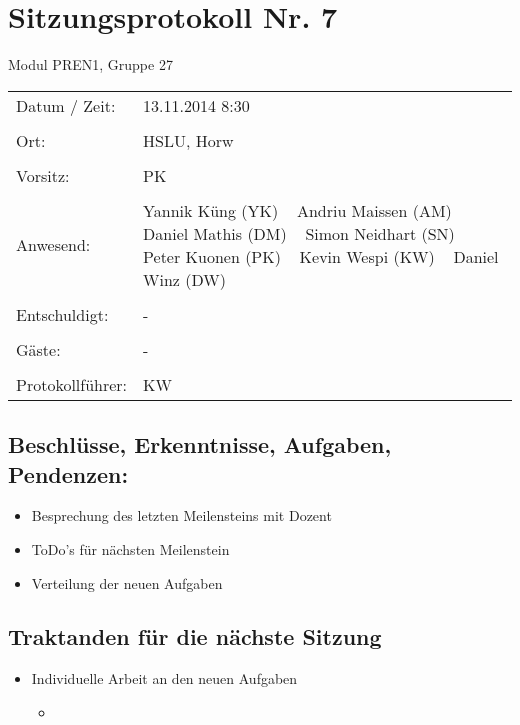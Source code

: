 \documentclass[a4paper,10pt,fleqn]{article}
\begin{document}
\section*{Sitzungsprotokoll Nr. 7}
Modul PREN1, Gruppe 27

\begin{longtable}[l]{@{}p{}@{}p{}@{}}
    Datum / Zeit: &
        13.11.2014 8:30
        \\\\
    Ort: &
        HSLU, Horw
        \\\\
    Vorsitz: &
        PK
        \\\\
    Anwesend: &
        Yannik Küng (YK) ~
        Andriu Maissen (AM) ~
        Daniel Mathis (DM) ~
        Simon Neidhart (SN) ~
        Peter Kuonen (PK) ~
        Kevin Wespi (KW) ~
        Daniel Winz (DW) ~
        \\\\
    Entschuldigt: &
        - ~
        \\\\
    Gäste: &
        - ~
        \\\\
    Protokollführer: &
        KW
        \\
\end{longtable}
%
\subsection*{Beschlüsse, Erkenntnisse, Aufgaben, Pendenzen:}
\begin{itemize}
    \item Besprechung des letzten Meilensteins mit Dozent
    \item ToDo's für nächsten Meilenstein
    \item Verteilung der neuen Aufgaben
\end{itemize}
%
\subsection*{Traktanden für die nächste Sitzung}
\begin{itemize}
    \item Individuelle Arbeit an den neuen Aufgaben
    \begin{itemize}
    	\item
	\end{itemize}
    
\end{itemize}
%
\end{document}
